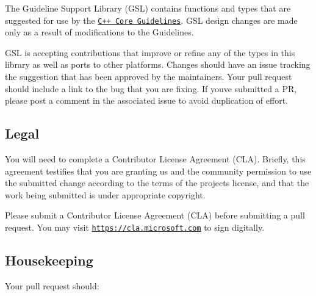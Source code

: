 The Guideline Support Library (G\+SL) contains functions and types that are suggested for use by the \href{https://github.com/isocpp/CppCoreGuidelines}{\tt C++ Core Guidelines}. G\+SL design changes are made only as a result of modifications to the Guidelines.

G\+SL is accepting contributions that improve or refine any of the types in this library as well as ports to other platforms. Changes should have an issue tracking the suggestion that has been approved by the maintainers. Your pull request should include a link to the bug that you are fixing. If you\textquotesingle{}ve submitted a PR, please post a comment in the associated issue to avoid duplication of effort.

\subsection*{Legal}

You will need to complete a Contributor License Agreement (C\+LA). Briefly, this agreement testifies that you are granting us and the community permission to use the submitted change according to the terms of the project\textquotesingle{}s license, and that the work being submitted is under appropriate copyright.

Please submit a Contributor License Agreement (C\+LA) before submitting a pull request. You may visit \href{https://cla.microsoft.com}{\tt https\+://cla.\+microsoft.\+com} to sign digitally.

\subsection*{Housekeeping}

Your pull request should\+:


